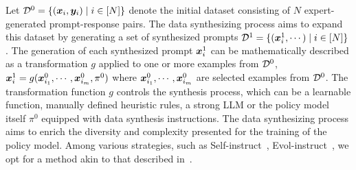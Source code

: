 Let ${\mathcal{D}}^0 = \{({\bm{x}}_i, {\bm{y}}_i) \mid i \in [N]\}$ denote the initial dataset consisting of $N$ expert-generated prompt-response pairs. The data synthesizing process aims to expand this dataset by generating a set of synthesized prompts ${\mathcal{D}}^1 = \{({\bm{x}}_i^1,\cdots) \mid i \in [N]\}$. The generation of each synthesized prompt ${\bm{x}}_i^1$ can be mathematically described as a transformation $g$ applied to one or more examples from ${\mathcal{D}}^0$, ${\bm{x}}_i^1 = g({\bm{x}}_{i_1}^0,\cdots,{\bm{x}}_{i_m}^0, \pi^0)$
where ${\bm{x}}_{i_1}^0,\cdots,{\bm{x}}_{i_m}^0$ are selected examples from ${\mathcal{D}}^0$. The transformation function $g$ controls the synthesis process, which can be a learnable function, manually defined heuristic rules, a strong LLM or the policy model itself $\pi^0$ equipped with data synthesis instructions. The data synthesizing process aims to enrich the diversity and complexity presented for the training of the policy model. Among various strategies, such as Self-instruct~\citep{wang2022self}, Evol-instruct~\citep{xu2023wizardlm}, we opt for a method akin to that described in~\cite{yu2023metamath}.



